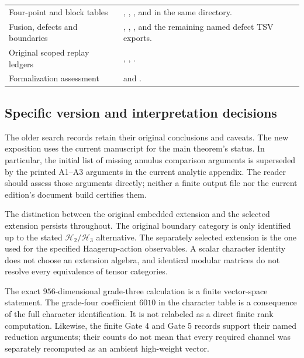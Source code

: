 \begin{longtable}{@{}P{.28\linewidth}P{.63\linewidth}@{}}
Four-point and block tables &
,
,
, and
 in the same directory.\\
Fusion, defects and boundaries &
,
, ,
and the remaining named defect TSV exports.\\
Original scoped replay ledgers &
,
,
.\\
Formalization assessment &
 and
.\\
\bottomrule
\end{longtable}

\subsection{Specific version and interpretation decisions}

The older search records retain their original conclusions and caveats.
The new exposition uses the current manuscript for the main theorem's
status. In particular, the initial list of missing annulus comparison
arguments is superseded by the printed A1--A3 arguments in the current
analytic appendix. The reader should assess those arguments directly;
neither a finite output file nor the current edition's document build
certifies them.

The distinction between the original embedded extension and the selected
extension persists throughout. The original boundary category is only
identified up to the stated $\mathcal H_2/\mathcal H_3$ alternative. The
separately selected extension is the one used for the specified
Haagerup-action observables. A scalar character identity does not choose
an extension algebra, and identical modular matrices do not resolve
every equivalence of tensor categories.

The exact $956$-dimensional grade-three calculation is a finite vector-space
statement. The grade-four coefficient $6010$ in the character table is
a consequence of the full character identification. It is not relabeled
as a direct finite rank computation. Likewise, the finite Gate 4 and Gate 5
records support their named reduction arguments; their counts do not mean
that every required channel was separately recomputed as an ambient
high-weight vector.

